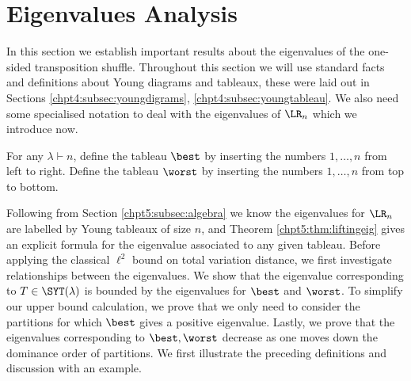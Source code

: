 \documentclass[11pt]{report}
\begin{document}
\section{Eigenvalues Analysis}
\label{chpt5:sec:eigenvalues}
In this section we establish important results about the eigenvalues of the one-sided transposition shuffle. Throughout this section we will use 
standard facts and definitions about Young diagrams and tableaux, these 
were laid out in Sections \ref{chpt4:subsec:youngdigrams}, \ref{chpt4:subsec:youngtableau}. 
We also need some specialised notation to deal with the eigenvalues of 
$\LR_{n}$ which we introduce now.

\begin{defn}
	\label{def:bestworst}
	For any $\lambda \vdash n$, define the tableau 
	$\best$ by inserting the numbers $1,\dots, n$ from left to right. Define the 
	tableau $\worst$ by inserting the numbers $1,\dots, n$ from top to bottom.
\end{defn}

Following from Section \ref{chpt5:subsec:algebra} we know the eigenvalues for $\LR_{n}$ are labelled by Young tableaux of size $n$, and Theorem \ref{chpt5:thm:liftingeig} 
gives an explicit formula for the eigenvalue associated to any given tableau. 
Before applying the classical $\ell^{2}$ bound on total variation distance, we first 
investigate relationships between the eigenvalues. 
We show that the eigenvalue corresponding to $T \in \SYT(\lambda)$ is bounded by 
the eigenvalues for $\best$ and $\worst$.  
To simplify our upper bound calculation, 
we prove that we only need to consider the partitions for which $\best$ gives a positive eigenvalue. Lastly, we prove that the eigenvalues corresponding to $\best,\worst$ decrease 
as one moves down the dominance order of partitions. 
We first illustrate the preceding definitions and discussion with an example.
\end{document}
